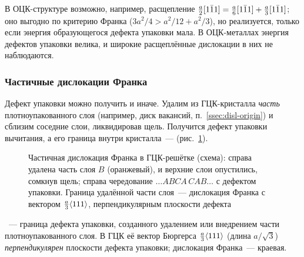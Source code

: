 В ОЦК-структуре возможно, например, расщепление
$\frac a2[1\bar{1}1]=\frac a6[1\bar{1}1]+\frac a3[1\bar{1}1]$; оно выгодно по
критерию Франка ($3a^2/4>a^2/12+a^2/3$), но реализуется, только если
энергия образующегося дефекта упаковки мала. В ОЦК-металлах энергия
дефектов упаковки велика, и широкие расщеплённые дислокации в них не
наблюдаются.

\subsubsection{Частичные дислокации Франка}

Дефект упаковки можно получить и иначе. Удалим из ГЦК-кристалла
\emph{часть} плотноупакованного слоя (например, диск вакансий,
п.~\ref{ssec:disl-origin}) и сблизим соседние слои, ликвидировав щель.
Получится дефект упаковки вычитания, а его граница внутри кристалла~—
 (рис.~\ref{fig:frank-partial}).

\begin{figure}[ht]
\centering
{}
\caption{Частичная дислокация Франка в ГЦК-решётке (схема): справа удалена
часть слоя $B$ (оранжевый), и верхние слои опустились, сомкнув щель;
справа чередование $\ldots ABCA\,CAB\ldots$ с дефектом упаковки. Граница
удалённой части слоя~— дислокация Франка с вектором $\frac a3\langle 111\rangle$,
перпендикулярным плоскости дефекта}
\label{fig:frank-partial}
\end{figure}

\begin{opredelenie}
~— граница дефекта упаковки, созданного
удалением или внедрением части плотноупакованного слоя. В ГЦК её вектор
Бюргерса $\frac a3\langle 111\rangle$ (длина $a/\sqrt3$) \emph{перпендикулярен}
плоскости дефекта упаковки; дислокация Франка~— краевая.
\end{opredelenie}

